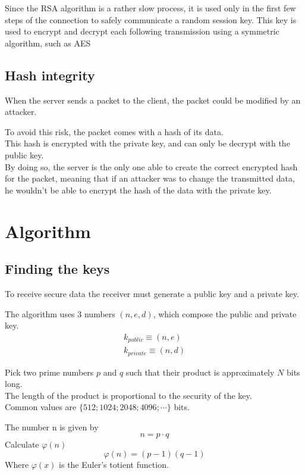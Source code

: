 \documentclass{article}
\begin{document}
Since the RSA algorithm is a rather slow process, it is used only in the first few steps of the connection to safely communicate a random session key.
This key is used to encrypt and decrypt each following transmission using a symmetric algorithm, such as AES

\subsection{Hash integrity}

When the server sends a packet to the client, the packet could be modified by an attacker.

To avoid this risk, the packet comes with a hash of its data.\\
This hash is encrypted with the private key, and can only be decrypt with the public key.\\
By doing so, the server is the only one able to create the correct encrypted hash for the packet, meaning that if an attacker was to change the transmitted data, he wouldn't be able to encrypt the hash of the data with the private key.

\pagebreak

\section{Algorithm}

\subsection{Finding the keys}

To receive secure data the receiver must generate a public key and a private key.

The algorithm uses 3 numbers \((n,e,d)\), which compose the public and private key.
\begin{align*}
	k_{public}\equiv(n,e)\\
	k_{private}\equiv(n,d)
\end{align*}

Pick two prime numbers \(p\) and \(q\) such that their product is approximately \(N\) bits long.\\
The length of the product is proportional to the security of the key.\\
Common values are \(\{512;1024;2048;4096;\cdots\}\) bits.

The number n is given by
\[
	n=p\cdot q
\]
Calculate \(\varphi(n)\)
\[
	\varphi(n)=(p-1)(q-1)
\]
Where \(\varphi(x)\) is the Euler's totient function.
\end{document}
